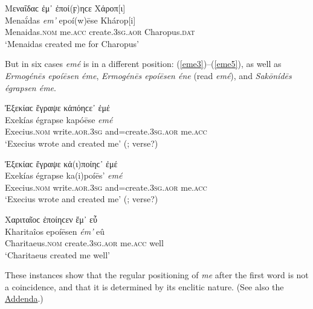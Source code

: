 \begin{exe}
\ex Μεναΐδαϲ {ἐμ᾽} ἐποί(ϝ)ηϲε Χάροπ{[}ι{]}\\
\gll Menaḯdas \emph{em'} epoí(w)ēse Khárop{[}i{]}\\
Menaidas.\textsc{nom} me.\textsc{acc} create.\textsc{3sg.aor} Charopus.\textsc{dat}\\
\trans `Menaidas created me for Charopus' \citep[168]{Pottier1888}
\label{eme2}
\end{exe}

But in six cases \textit{emé} is in a different position: (\ref{eme3})--(\ref{eme5}), as well as \citet[82]{Klein1887} \textit{Ermogénēs epoíēsen \emph{éme}}, \citet[83]{Klein1887} \textit{Ermogénēs epoíēsen \emph{éne}} (read \textit{emé}), and \citet[85]{Klein1887} \textit{Sakōnídēs égrapsen \emph{éme}}.

\begin{exe}
\ex Ἐξεκίαϲ ἔγραψε κἀπόηϲε᾽ {ἐμέ}\\
\gll Exekías égrapse kapóēse \emph{emé}\\
Execius.\textsc{nom} write.\textsc{aor.3sg} and=create.\textsc{3sg.aor} me.\textsc{acc}\\
\trans `Execius wrote and created me' (\citealp[39]{Klein1887}; verse?)
\label{eme3}
\end{exe}

\begin{exe}
\ex Ἐξεκίαϲ ἔγραψε κἀ(ι)ποίηϲ᾽ {ἐμέ}\\
\gll Exekías égrapse ka(i)poíēs' \emph{emé}\\
Execius.\textsc{nom} write.\textsc{aor.3sg} and=create.\textsc{3sg.aor} me.\textsc{acc}\\
\trans `Execius wrote and created me' (\citealp[40]{Klein1887}; verse?)
\label{eme4}
\end{exe}

\begin{exe}
\ex Χαριταῖοϲ ἐποίηϲεν {ἔμ᾽} εὖ\\
\gll Kharitaîos epoíēsen \emph{ém'} eû\\
Charitaeus.\textsc{nom} create.\textsc{3sg.aor} me.\textsc{acc} well\\
\trans `Charitaeus created me well' \citep[51]{Klein1887}
\label{eme5}
\end{exe}

These instances show that the regular positioning of \textit{me} after the first word is not a coincidence, and that it is determined by its enclitic nature. (See also the \hyperlink{addenda}{Addenda}.)\label{forAddenda2}


